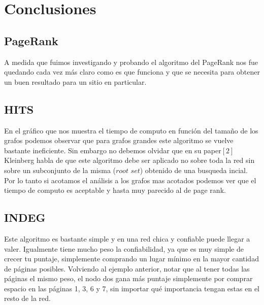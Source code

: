 
\section{Conclusiones}

\subsection{PageRank}

A medida que fuimos investigando y probando el algoritmo del PageRank nos fue quedando cada vez más claro como es que funciona y que se necesita para obtener un buen resultado para un sitio en particular.
\newpage


\subsection{HITS}

En el gráfico que nos muestra el tiempo de computo en función del tamaño de los grafos podemos observar que para grafos grandes este algoritmo se vuelve bastante ineficiente. Sin embargo no debemos olvidar que en su paper$[2]$ Kleinberg habla de que este algoritmo debe ser aplicado no sobre toda la red sin sobre un subconjunto de la misma ($\textit{root set}$) obtenido de una busqueda incial. Por lo tanto si acotamos el análisis a los grafos mas acotados podemos ver que el tiempo de computo es aceptable y hasta muy parecido al de page rank. 

\subsection{INDEG}

Este algoritmo es bastante simple y en una red chica y confiable puede llegar a valer. Igualmente tiene mucho peso la confiabilidad, ya que es muy simple de crecer tu puntaje, simplemente comprando un lugar mínimo en la mayor cantidad de páginas posibles. Volviendo al ejemplo anterior, notar que al tener todas las páginas el mismo peso, el nodo dos gana más puntaje simplemente por comprar espacio en las páginas 1, 3, 6 y 7, sin importar qué importancia tengan estas en el resto de la red.

